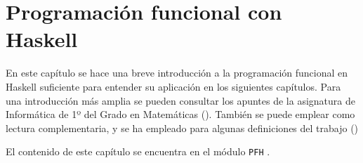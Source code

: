 \chapter{Programación funcional con Haskell}

En este capítulo se hace una breve introducción a la programación funcional en
Haskell suficiente para entender su aplicación en los siguientes
capítulos. Para una introducción más amplia se pueden consultar los apuntes de
la asignatura de Informática de 1º del Grado en Matemáticas
(\cite{Alonso-15b}). También se puede emplear como lectura complementaria, y se
ha empleado para algunas definiciones del trabajo (\cite{YerPal-90})

El contenido de este capítulo se encuentra en el módulo \texttt{PFH} 
.

